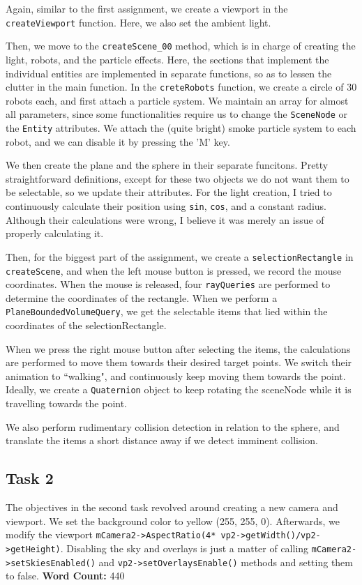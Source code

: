 \documentclass{article}
\begin{document}
Again, similar to the first assignment, we create a viewport in the \texttt{createViewport} function.
Here, we also set the ambient light.

Then, we move to the \texttt{createScene\_00} method, which is in charge of creating the light, robots, and
the particle effects. Here, the sections that implement the individual entities are implemented in separate
functions, so as to lessen the clutter in the main function. In the \texttt{creteRobots} function, we create
a circle of 30 robots each, and first attach a particle system. We maintain an array for almost all parameters,
since some functionalities require us to change the \texttt{SceneNode} or the \texttt{Entity} attributes.
We attach the (quite bright) smoke particle system to each robot, and we can disable it by pressing the 'M' key.

We then create the plane and the sphere in their separate funcitons. Pretty straightforward definitions, except for
these two objects we do not want them to be selectable, so we update their attributes. For the light creation, I tried
to continuously calculate their position using \texttt{sin}, \texttt{cos}, and a constant radius. Although their
calculations were wrong, I believe it was merely an issue of  properly calculating it.

Then, for the biggest part of the assignment, we create a \texttt{selectionRectangle} in \texttt{createScene}, and when
the left mouse button is pressed, we record the mouse coordinates. When the mouse is released, four \texttt{rayQueries}
are performed to determine the coordinates of the rectangle. When we perform a \texttt{PlaneBoundedVolumeQuery}, we
get the selectable items that lied within the coordinates of the selectionRectangle.

When we press the right mouse button after selecting the items, the calculations are performed to move them towards their
desired target points. We switch their animation to ``walking", and continuously keep moving them towards the point.
Ideally, we create a \texttt{Quaternion} object to keep rotating the sceneNode while it is travelling towards the point.

We also perform rudimentary collision detection in relation to the sphere, and translate the items a short distance 
away if we detect imminent collision.

\subsection{Task 2}
The objectives in the second task revolved around creating a new camera and viewport. We set the background color to 
yellow (255, 255, 0). Afterwards, we modify the viewport \texttt{mCamera2->AspectRatio(4* vp2->getWidth()/vp2->getHeight)}.
Disabling the sky and overlays is just a matter of calling \texttt{mCamera2->setSkiesEnabled()} and 
\texttt{vp2->setOverlaysEnable()} methods and setting them to false.
\textbf{Word Count: }440
\end{document}

